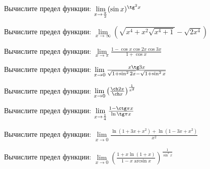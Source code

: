 \documentclass[russian]{article}
\begin{document}
Вычислите предел функции:
$\lim\limits_{x \to \frac{\pi}{2}} (\sin x)^{\tg^2 x}$

Вычислите предел функции:
$\lim\limits_{x \to \infty} (\sqrt{x^4 + x^2\sqrt{x^4 + 1}} - \sqrt{2x^4})$

Вычислите предел функции:
$\lim\limits_{x \to \pi} \frac{1 - \cos x \cos 2x \cos 3x}{1 + \cos x}$

Вычислите предел функции:
$\lim\limits_{x \to 0} \frac{x\tg 3x}{\sqrt{1 + \sin^2 2x} - \sqrt{1 + \sin^2 x}}$

Вычислите предел функции:
$\lim\limits_{x \to 0} \left(\frac{\ch 2x}{\ch x}\right)^\frac{1}{x^2}$



Вычислите предел функции:
$\lim\limits_{x \to \frac{1}{4}} \frac{1 - \ctg \pi x}{\ln \tg \pi x}$

Вычислите предел функции:
$\lim\limits_{x \to 0} \frac{\ln(1 + 3x + x^2) + \ln(1 - 3x + x^2)}{x^2}$

Вычислите предел функции:
$\lim\limits_{x \to 0} \left(\frac{1 + x\ln(1 + x)}{1 - x\arcsin x}\right)^\frac{1}{\sin^2 x}$
\end{document}

